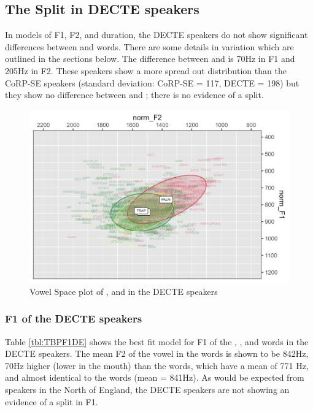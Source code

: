 \documentclass[../../00.FullDoc/tex/Thesis]{subfiles}
\begin{document}
\subsection{The Split in DECTE speakers}
In models of F1, F2, and duration, the DECTE speakers do not show significant differences between \trap{} and \bath{} words. There are some details in variation which are outlined in the sections below. The difference between \trap{} and \palm{} is 70Hz in F1 and 205Hz in F2. These speakers show a more spread out \palm{} distribution than the CoRP-SE speakers (standard deviation: CoRP-SE = 117, DECTE = 198) but they show no difference between \trap {} and \bath{}; there is no evidence of a \TB{} split.

\begin{figure}[h]
	\includegraphics[width=\textwidth]{../figures/TBP-DE-vplot.png}
	\caption{Vowel Space plot of \trap{},\bath{} and \palm{} in the DECTE speakers} \label{fig:TBPvplotDE}
\end{figure}



\subsubsection{F1 of the DECTE speakers}

Table \ref{tbl:TBPF1DE} shows the best fit model for F1 of the \trap{}, \bath{}, and \palm{} words in the DECTE speakers. The mean F2 of the vowel in the \bath{} words is shown to be 842Hz, 70Hz higher (lower in the mouth) than the \palm{} words, which have a mean of 771 Hz, and almost identical to the \trap{} words (mean = 841Hz). As would be expected from speakers in the North of England, the DECTE speakers are not showing an evidence of a \TB{} split in F1.
\end{document}
